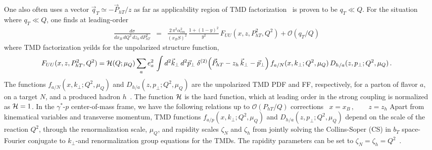 \documentclass[final,3p,times,onecolumn,sort&compress,hidelinks]{elsarticle}
\newcommand\3[1]{\boldsymbol{#1}}
\begin{document}
One also often uses a vector $\vec{q}_T \simeq -\vec{P}_{hT}/z$ as far as applicability region of TMD factorization~\cite{Collins:2011zzd} is proven to be $q_T \ll Q$.
For the situation where $q_{T}\ll Q$, one finds at leading-order~\cite{Bacchetta:2006tn}
\begin{eqnarray}
\frac{d\sigma}
{dx_B\, dQ^2 \, dz_h \, dP_{hT}^2} &\!\!\!=\!\!\!&
\frac {2 \, \pi^2 \alpha_{em}^2}{(x_B S)^2} \, \frac{ 1 + (1-y)^2 }{y^2}\,F_{UU}(x,z,P_{hT}^2,Q^2) + \mathcal{O}(q_{T}/Q)
\label{e:dsigma}
\end{eqnarray}
where TMD factorization yeilds for the unpolarized structure function\cite{Collins:2011zzd},
\begin{equation}
F_{UU}(x,z,P_{hT}^2,Q^2)  = {\cal H} (Q; \mu_Q)\sum_{a} e_a^2 \,
\int d^2\vec{k}_\perp \, d^2\vec{p}_\perp
\> \delta ^{(2)}\Big(\vec{P}_{hT} - z_h\,\vec{k}_\perp -\vec{p}_\perp\Big)\,
f_{a/N} (x, k_{\perp}; Q^2, \mu_Q) \, D_{h/a}(z, p_{\perp}; Q^2, \mu_Q)\,. \label{e:FUU} \\
\end{equation}
The functions $f_{a/N} (x, k_{\perp}; Q^2, \mu_Q)$ and $D_{h/a}(z, p_{\perp}; Q^2, \mu_Q)$ are the unpolarized TMD PDF and FF, respectively, for a parton of flavor
$a$, on a  target $N$, and a produced hadron $h$~\cite{Bacchetta:2006tn,Collins:2011zzd}.  The function ${\cal H}$ is the  hard function, which at leading order in the strong coupling
is normalized as ${\cal H} = 1$. In the $\gamma^*$-$p$ center-of-mass frame, we have the following relations up to $\mathcal{O}(P_{hT}/Q)$ corrections~\cite{Bacchetta:2006tn}
$x=x_B\,, \quad\quad z=z_h$  %
Apart from kinematical variables and transverse momentum, TMD functions $f_{a/p} (x, k_{\perp}; Q^2, \mu_Q)$ and $D_{h/a}(z, p_{\perp}; Q^2, \mu_Q)$ 
depend on the scale of the reaction $Q^2$,  through  the renormalization scale, $\mu_Q$, and  rapidity scales  $\zeta_N$ and $\zeta_h$ from jointly solving the Collins-Soper (CS) 
in $b_T$ space-Fourier conjugate to $k_{\perp}$-and renormalization group equations for the TMDs.
The rapidity parameters can be set to $\zeta_N=\zeta_h=Q^2$~\cite{Collins:2011zzd,Collins:2014jpa}.
\end{document}
